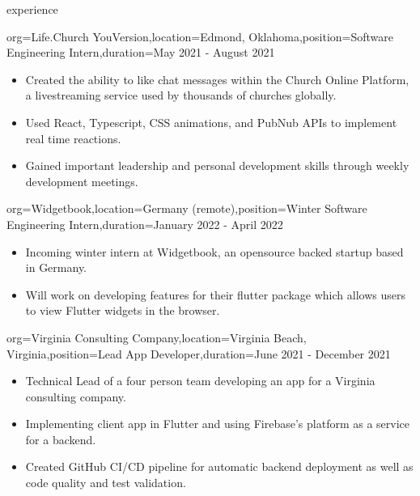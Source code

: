 \documentclass{resume}
\begin{document}
\begin{ResumeSection}{experience}
    \begin{ResumeSubsection}{org={Life.Church YouVersion},location={Edmond, Oklahoma},position={Software Engineering Intern},duration={May 2021 - August 2021}}
        \begin{itemize}
            \item {Created the ability to like chat messages within
                    the Church Online Platform, a livestreaming service used by
                thousands of churches globally.}
            \item {Used React, Typescript, CSS animations, and
                PubNub APIs to implement real time reactions.}
            \item Gained important leadership and personal development skills
                through weekly development meetings.
        \end{itemize}
    \end{ResumeSubsection}

    \begin{ResumeSubsection}{org={Widgetbook},location={Germany (remote)},position={Winter Software Engineering Intern},duration={January 2022 - April 2022}}
        \begin{itemize}
            \item Incoming winter intern at Widgetbook, an opensource backed startup based in Germany.
            \item Will work on developing features for their flutter package which allows users to view Flutter widgets in the browser.
        \end{itemize}
    \end{ResumeSubsection}

    \begin{ResumeSubsection}{org={Virginia Consulting Company},location={Virginia Beach, Virginia},position={Lead App Developer},duration={June 2021 - December 2021}}
        \begin{itemize}
            \item {Technical Lead of a four person team developing an app for a Virginia consulting company.}
            \item {Implementing client app in Flutter and using Firebase's platform as a service for a backend.}
            \item {Created GitHub CI/CD pipeline for automatic backend deployment as well as code quality and test validation.}
        \end{itemize}
    \end{ResumeSubsection}



\end{ResumeSection}
\end{document}
